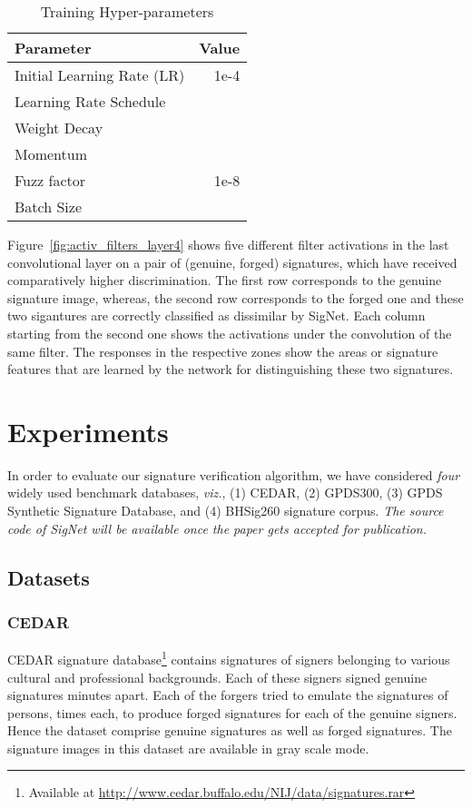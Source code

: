 \documentclass[times,twocolumn,final]{elsarticle}
\newcommand{\viz}{\textit{viz.}}
\newcommand{\fig}[1]{Figure~\ref{#1}}
\begin{document}
\begin{table}[ht]
\caption{Training Hyper-parameters}
\label{tab:hyp_param_signet}
\begin{center}
\begin{tabular}{ l r }
\hline
Parameter & Value \\
\hline
Initial Learning Rate (LR) & 1e-4\\
Learning Rate Schedule & \\
Weight Decay & \\
Momentum  & \\
Fuzz factor  & 1e-8\\
Batch Size & \\
\hline
\end{tabular}
\end{center}
\end{table}

\fig{fig:activ_filters_layer4} shows five different filter activations in the last convolutional layer on a pair of (genuine, forged) signatures, which have received comparatively higher discrimination. The first row corresponds to the genuine signature image, whereas, the second row corresponds to the forged one and these two sigantures are correctly classified as dissimilar by SigNet. Each column starting from the second one shows the activations under the convolution of the same filter. The responses in the respective zones show the areas or signature features that are learned by the network for distinguishing these two signatures. 
\section{Experiments}
\label{s:expt}
In order to evaluate our signature verification algorithm, we have considered \emph{four} widely used benchmark databases, \viz, (1) CEDAR, (2) GPDS300, (3) GPDS Synthetic Signature Database, and (4) BHSig260 signature corpus. \emph{The source code of SigNet will be available once the paper gets accepted for publication.}




\subsection{Datasets}
\label{sec:datasets}
\subsubsection{CEDAR}
\label{sec:cedar}
CEDAR signature database\footnote{Available at \url{http://www.cedar.buffalo.edu/NIJ/data/signatures.rar}} contains signatures of  signers belonging to various cultural and professional backgrounds. Each of these signers signed  genuine signatures  minutes apart. Each of the forgers tried to emulate the signatures of  persons,  times each, to produce  forged signatures for each of the genuine signers. Hence the dataset comprise  genuine signatures as well as  forged signatures. The signature images in this dataset are available in gray scale mode.
\end{document}
